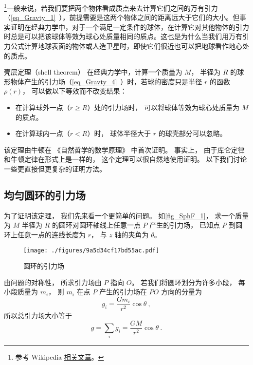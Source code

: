 

\footnote{参考 Wikipedia \href{https://en.wikipedia.org/wiki/Shell_theorem}{相关文章}。}一般来说，若我们要把两个物体看成质点来去计算它们之间的万有引力（\autoref{eq_Gravty_1}~），前提需要是这两个物体之间的距离远大于它们的大小。但事实证明在经典力学中，对于一个满足一定条件的球体，在计算它对其他物体的引力时总是可以把该球体等效为球心处质量相同的质点。这也是为什么当我们用万有引力公式计算地球表面的物体或人造卫星时，即使它们很近也可以把地球看作地心处的质点。

\begin{theorem}{壳层定理（shell theorem）}
在经典力学中，计算一个质量为 $M$， 半径为 $R$ 的球形物体产生的引力场（\autoref{eq_Gravty_4}~）时，若球的密度只是半径 $r$ 的函数 $\rho(r)$， 可以做以下等效而不改变结果：
\begin{itemize}
\item 在计算球外一点（$r \geqslant R$）处的引力场时， 可以将球体等效为球心处质量为 $M$ 的质点。
\item 在计算球内一点（$r < R$）时， 球体半径大于 $r$ 的球壳部分可以忽略。
\end{itemize}
\end{theorem}


该定理由牛顿在 《自然哲学的数学原理》 中首次证明。 事实上， 由于库仑定律和牛顿定律在形式上是一样的， 这个定理可以很自然地使用证明。 以下我们讨论一些更直接但更复杂的证明方法。

\subsection{均匀圆环的引力场}
为了证明该定理， 我们先来看一个更简单的问题。 如\autoref{fig_SphF_1}， 求一个质量为 $M$ 半径为 $R$ 的圆环对圆环轴线上任意一点 $P$ 产生的引力场， 已知点 $P$ 到圆环上任意一点的连线长度为 $r$， 与 $z$ 轴的夹角为 $\theta$。

\begin{figure}[ht]
\centering
\texttt{[image: ./figures/9a5d34cf17bd55ac.pdf]}
\caption{圆环的引力场} \label{fig_SphF_1}
\end{figure}

由问题的对称性， 所求引力场由 $P$ 指向 $O$。 若我们将圆环划分为许多小段， 每小段质量为 $m_i$， 则 $m_i$ 在点 $P$ 产生的引力场在 $PO$ 方向的分量为
\begin{equation}
g_i = \frac{Gm_i}{r^2}\cos\theta~,
\end{equation}
所以总引力场大小等于
\begin{equation}\label{eq_SphF_2}
g = \sum_i g_i = \frac{GM}{r^2}\cos\theta~.
\end{equation}

